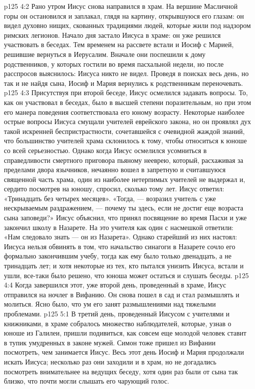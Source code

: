 \vs p125 4:2 Рано утром Иисус снова направился в храм. На вершине Масличной горы он остановился и заплакал, глядя на картину, открывшуюся его глазам: он видел духовно нищих, скованных традициями людей, которые жили под надзором римских легионов. Начало дня застало Иисуса в храме: он уже решился участвовать в беседах. Тем временем на рассвете встали и Иосиф с Марией, решившие вернуться в Иерусалим. Вначале они поспешили к дому родственников, у которых гостили во время пасхальной недели, но после расспросов выяснилось: Иисуса никто не видел. Проведя в поисках весь день, но так и не найдя сына, Иосиф и Мария вернулись к родственникам переночевать.
\vs p125 4:3 Присутствуя при второй беседе, Иисус осмелился задавать вопросы. То, как он участвовал в беседах, было в высшей степени поразительным, но при этом его манера поведения соответствовала его юному возрасту. Некоторые наиболее острые вопросы Иисуса смущали учителей еврейского закона, но он проявлял дух такой искренней беспристрастности, сочетавшейся с очевидной жаждой знаний, что большинство учителей храма склонилось к тому, чтобы относиться к юноше со всей серьезностью. Однако когда Иисус осмелился усомниться в справедливости смертного приговора пьяному нееврею, который, расхаживая за пределами двора язычников, нечаянно вошел в запретную и считавшуюся священной часть храма, один из наиболее нетерпимых учителей не выдержал и, сердито посмотрев на юношу, спросил, сколько тому лет. Иисус ответил: «Тринадцать без четырех месяцев». «Тогда, --- возразил учитель с уже нескрываемым раздражением, --- почему ты здесь, если не достиг еще возраста сына заповеди?» Иисус объяснил, что принял посвящение во время Пасхи и уже закончил школу в Назарете. На это учителя как один с насмешкой ответили: «Нам следовало знать --- он из Назарета». Однако старейший из них настоял: Иисуса нельзя обвинять в том, что начальство синагоги в Назарете сочло его формально закончившим учебу, тогда как ему было только двенадцать, а не тринадцать лет; и хотя некоторые из тех, кто пытался унизить Иисуса, встали и ушли, все\hyp{}таки было решено, что юноша может остаться и слушать беседы.
\vs p125 4:4 Когда завершился этот, уже второй день, проведенный в храме, Иисус отправился на ночлег в Вифанию. Он снова пошел в сад и стал размышлять и молиться. Ясно было, что ум его занят размышлениями над тяжелыми проблемами.
\vs p125 5:1 В третий день, проведенный Иисусом с учителями и книжниками, в храме собралось множество наблюдателей, которые, узнав о юноше из Галилеи, пришли подивиться, как совсем еще молодой человек ставит в тупик умудренных в законе мужей. Симон тоже пришел из Вифании посмотреть, чем занимается Иисус. Весь этот день Иосиф и Мария продолжали искать Иисуса; несколько раз они заходили и в храм, но не догадались посмотреть внимательнее на ведущих беседу, хотя один раз были от сына так близко, что почти могли слышать его чарующий голос.
